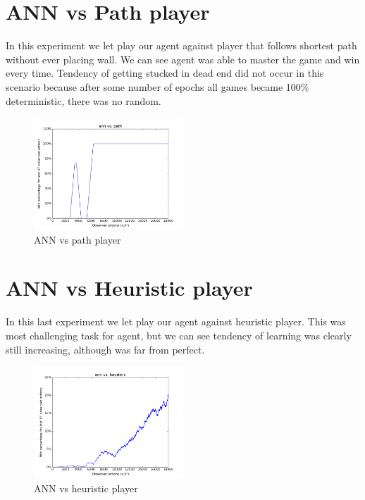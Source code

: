\section{ANN vs Path player}

In this experiment we let play our agent against player that follows shortest path without ever
placing wall. We can see agent was able to master the game and win every time. Tendency of getting
stucked in dead end did not occur in this scenario because after some number of epochs all games became
100\% deterministic, there was no random.

\begin{figure}[!tbh]
  \centering
    \graphicspath{{pictures/}}
  \includegraphics[width=0.50\textwidth]{eps_vs_path.png}
  \vspace*{-0.20cm}
  \caption{ANN vs path player}
  \label{fig:p1}
  \vspace*{-0.00cm}
\end{figure}

\section{ANN vs Heuristic player}

In this last experiment we let play our agent against heuristic player. This was most challenging
task for agent, but we can see tendency of learning was clearly still increasing, although was far
from perfect.

\begin{figure}[t!]
  \centering
    \graphicspath{{pictures/}}
  \includegraphics[width=0.50\textwidth]{eps_vs_heuristic.png}
  \vspace*{-0.20cm}
  \caption{ANN vs heuristic player}
  \label{fig:p1}
  \vspace*{-0.00cm}
\end{figure}

